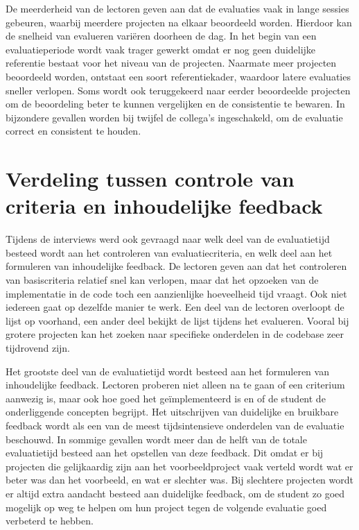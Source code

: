 \vspace{1em}

De meerderheid van de lectoren geven aan dat de evaluaties vaak in lange sessies gebeuren, waarbij meerdere projecten na elkaar beoordeeld worden. Hierdoor kan de snelheid van evalueren variëren doorheen de dag. In het begin van een evaluatieperiode wordt vaak trager gewerkt omdat er nog geen duidelijke referentie bestaat voor het niveau van de projecten. Naarmate meer projecten beoordeeld worden, ontstaat een soort referentiekader, waardoor latere evaluaties sneller verlopen. Soms wordt ook teruggekeerd naar eerder beoordeelde projecten om de beoordeling beter te kunnen vergelijken en de consistentie te bewaren. In bijzondere gevallen worden bij twijfel de collega's ingeschakeld, om de evaluatie correct en consistent te houden.

\section{Verdeling tussen controle van criteria en inhoudelijke feedback}

Tijdens de interviews werd ook gevraagd naar welk deel van de evaluatietijd besteed wordt aan het controleren van evaluatiecriteria, en welk deel aan het formuleren van inhoudelijke feedback. De lectoren geven aan dat het controleren van basiscriteria relatief snel kan verlopen, maar dat het opzoeken van de implementatie in de code toch een aanzienlijke hoeveelheid tijd vraagt. Ook niet iedereen gaat op dezelfde manier te werk. Een deel van de lectoren overloopt de lijst op voorhand, een ander deel bekijkt de lijst tijdens het evalueren. Vooral bij grotere projecten kan het zoeken naar specifieke onderdelen in de codebase zeer tijdrovend zijn.

\vspace{1em}

Het grootste deel van de evaluatietijd wordt besteed aan het formuleren van inhoudelijke feedback. Lectoren proberen niet alleen na te gaan of een criterium aanwezig is, maar ook hoe goed het geïmplementeerd is en of de student de onderliggende concepten begrijpt. Het uitschrijven van duidelijke en bruikbare feedback wordt als een van de meest tijdsintensieve onderdelen van de evaluatie beschouwd. In sommige gevallen wordt meer dan de helft van de totale evaluatietijd besteed aan het opstellen van deze feedback. Dit omdat er bij projecten die gelijkaardig zijn aan het voorbeeldproject vaak verteld wordt wat er beter was dan het voorbeeld, en wat er slechter was. Bij slechtere projecten wordt er altijd extra aandacht besteed aan duidelijke feedback, om de student zo goed mogelijk op weg te helpen om hun project tegen de volgende evaluatie goed verbeterd te hebben.

